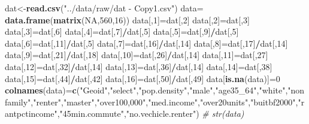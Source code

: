 \documentclass[]{article}
\newenvironment{Shaded}{\begin{snugshade}}{\end{snugshade}}
\newcommand{\KeywordTok}[1]{\textcolor[rgb]{0.13,0.29,0.53}{\textbf{#1}}}
\newcommand{\DecValTok}[1]{\textcolor[rgb]{0.00,0.00,0.81}{#1}}
\newcommand{\StringTok}[1]{\textcolor[rgb]{0.31,0.60,0.02}{#1}}
\newcommand{\CommentTok}[1]{\textcolor[rgb]{0.56,0.35,0.01}{\textit{#1}}}
\newcommand{\OtherTok}[1]{\textcolor[rgb]{0.56,0.35,0.01}{#1}}
\newcommand{\OperatorTok}[1]{\textcolor[rgb]{0.81,0.36,0.00}{\textbf{#1}}}
\newcommand{\NormalTok}[1]{#1}
\begin{document}
\begin{Shaded}
\begin{Highlighting}[]
\NormalTok{dat<-}\KeywordTok{read.csv}\NormalTok{(}\StringTok{"../data/raw/dat - Copy1.csv"}\NormalTok{)}
\NormalTok{data=}\StringTok{ }\KeywordTok{data.frame}\NormalTok{(}\KeywordTok{matrix}\NormalTok{(}\OtherTok{NA}\NormalTok{,}\DecValTok{560}\NormalTok{,}\DecValTok{16}\NormalTok{))}
\NormalTok{data[,}\DecValTok{1}\NormalTok{]=dat[,}\DecValTok{2}\NormalTok{]}
\NormalTok{data[,}\DecValTok{2}\NormalTok{]=dat[,}\DecValTok{3}\NormalTok{]}
\NormalTok{data[,}\DecValTok{3}\NormalTok{]=dat[,}\DecValTok{6}\NormalTok{]}
\NormalTok{data[,}\DecValTok{4}\NormalTok{]=dat[,}\DecValTok{7}\NormalTok{]}\OperatorTok{/}\NormalTok{dat[,}\DecValTok{5}\NormalTok{]}
\NormalTok{data[,}\DecValTok{5}\NormalTok{]=dat[,}\DecValTok{9}\NormalTok{]}\OperatorTok{/}\NormalTok{dat[,}\DecValTok{5}\NormalTok{]}
\NormalTok{data[,}\DecValTok{6}\NormalTok{]=dat[,}\DecValTok{11}\NormalTok{]}\OperatorTok{/}\NormalTok{dat[,}\DecValTok{5}\NormalTok{]}
\NormalTok{data[,}\DecValTok{7}\NormalTok{]=dat[,}\DecValTok{16}\NormalTok{]}\OperatorTok{/}\NormalTok{dat[,}\DecValTok{14}\NormalTok{]}
\NormalTok{data[,}\DecValTok{8}\NormalTok{]=dat[,}\DecValTok{17}\NormalTok{]}\OperatorTok{/}\NormalTok{dat[,}\DecValTok{14}\NormalTok{]}
\NormalTok{data[,}\DecValTok{9}\NormalTok{]=dat[,}\DecValTok{21}\NormalTok{]}\OperatorTok{/}\NormalTok{dat[,}\DecValTok{18}\NormalTok{]}
\NormalTok{data[,}\DecValTok{10}\NormalTok{]=dat[,}\DecValTok{26}\NormalTok{]}\OperatorTok{/}\NormalTok{dat[,}\DecValTok{14}\NormalTok{]}
\NormalTok{data[,}\DecValTok{11}\NormalTok{]=dat[,}\DecValTok{27}\NormalTok{]}
\NormalTok{data[,}\DecValTok{12}\NormalTok{]=dat[,}\DecValTok{32}\NormalTok{]}\OperatorTok{/}\NormalTok{dat[,}\DecValTok{14}\NormalTok{]}
\NormalTok{data[,}\DecValTok{13}\NormalTok{]=dat[,}\DecValTok{36}\NormalTok{]}\OperatorTok{/}\NormalTok{dat[,}\DecValTok{14}\NormalTok{]}
\NormalTok{data[,}\DecValTok{14}\NormalTok{]=dat[,}\DecValTok{38}\NormalTok{]}
\NormalTok{data[,}\DecValTok{15}\NormalTok{]=dat[,}\DecValTok{44}\NormalTok{]}\OperatorTok{/}\NormalTok{dat[,}\DecValTok{42}\NormalTok{]}
\NormalTok{data[,}\DecValTok{16}\NormalTok{]=dat[,}\DecValTok{50}\NormalTok{]}\OperatorTok{/}\NormalTok{dat[,}\DecValTok{49}\NormalTok{]}
\NormalTok{data[}\KeywordTok{is.na}\NormalTok{(data)]=}\DecValTok{0}
\KeywordTok{colnames}\NormalTok{(data)=}\KeywordTok{c}\NormalTok{(}\StringTok{"Geoid"}\NormalTok{,}\StringTok{"select"}\NormalTok{,}\StringTok{"pop.density"}\NormalTok{,}\StringTok{"male"}\NormalTok{,}\StringTok{"age35_64"}\NormalTok{,}\StringTok{"white"}\NormalTok{,}\StringTok{"nonfamily"}\NormalTok{,}\StringTok{"renter"}\NormalTok{,}\StringTok{"master"}\NormalTok{,}\StringTok{"over100,000"}\NormalTok{,}\StringTok{"med.income"}\NormalTok{,}\StringTok{"over20units"}\NormalTok{,}\StringTok{"buitbf2000"}\NormalTok{,}\StringTok{"rantpctincome"}\NormalTok{,}\StringTok{"45min.commute"}\NormalTok{,}\StringTok{"no.vechicle.renter"}\NormalTok{)}
\CommentTok{# str(data)}
\end{Highlighting}
\end{Shaded}
\end{document}
